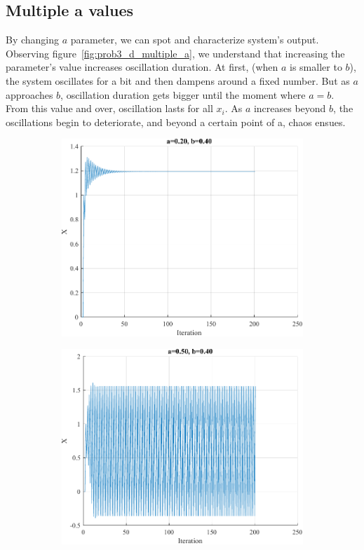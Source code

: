 \subsection{Multiple a values}

By changing $a$ parameter, we can spot and characterize system's output. Observing figure~\ref{fig:prob3_d_multiple_a}, we understand that increasing the parameter's value increases oscillation duration. At first, (when $a$ is smaller to $b$), the system oscillates for a bit and then dampens around a fixed number. But as $a$ approaches $b$, oscillation duration gets bigger until the moment where $a=b$.
From this value and over, oscillation lasts for all $x_i$. As $a$ increases beyond $b$, the oscillations begin to deteriorate, and beyond a certain point of a, chaos ensues.
\begin{figure}[H]
	\centering
	\begin{subfigure}{0.3\textwidth}
		\centering
		\includegraphics[width=\textwidth]{../Problem 3/prob3_(d)_a_0.20_b_0.40.pdf}
		\caption{}
	\end{subfigure}
	\begin{subfigure}{0.3\textwidth}
		\centering
		\includegraphics[width=\textwidth]{../Problem 3/prob3_(d)_a_0.50_b_0.40.pdf}

\end{subfigure}
\end{figure}

